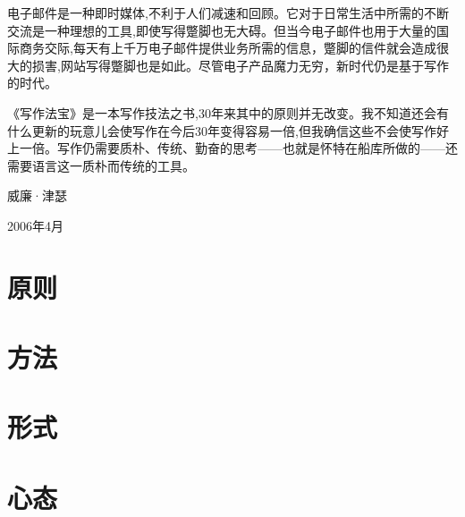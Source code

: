 \documentclass{ctexbook}
\begin{document}
电子邮件是一种即时媒体,不利于人们减速和回顾。它对于日常生活中所需的不断交流是一种理想的工具,即使写得蹩脚也无大碍。但当今电子邮件也用于大量的国际商务交际,每天有上千万电子邮件提供业务所需的信息，蹩脚的信件就会造成很大的损害,网站写得蹩脚也是如此。尽管电子产品魔力无穷，新时代仍是基于写作的时代。

《写作法宝》是一本写作技法之书,30年来其中的原则并无改变。我不知道还会有什么更新的玩意儿会使写作在今后30年变得容易一倍,但我确信这些不会使写作好上一倍。写作仍需要质朴、传统、勤奋的思考——也就是怀特在船库所做的——还需要语言这一质朴而传统的工具。

威廉·津瑟

2006年4月

\tableofcontents
\mainmatter

\part{原则}






\part{方法}




\part{形式}










\part{心态}







\end{document}
